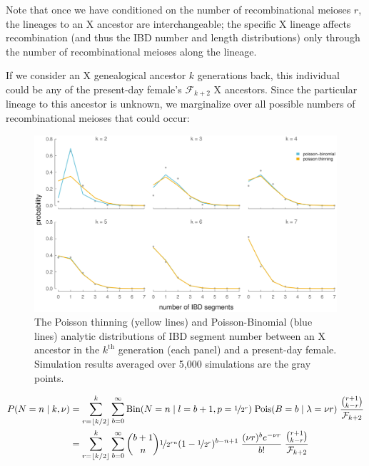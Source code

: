 \documentclass[11pt]{article}
\begin{document}
Note that once we have conditioned on the number of recombinational meioses $r$,
the lineages to an X ancestor are interchangeable; the specific X lineage
affects recombination (and thus the IBD number and length distributions) only
through the number of recombinational meioses along the lineage. 

If we consider an X genealogical ancestor $k$ generations back, this individual
could be any of the present-day female's $\mathcal{F}_{k+2}$ X ancestors. Since
the particular lineage to this ancestor is unknown, we marginalize over all
possible numbers of recombinational meioses that could occur:

\begin{figure}[!ht]
  \centering
  \includegraphics[width=\textwidth]{images/x-ancestor-blockcounts}

  \caption{The Poisson thinning (yellow lines) and Poisson-Binomial (blue
  lines) analytic distributions of IBD segment number between an X ancestor in
the $k^\text{th}$ generation (each panel) and a present-day female. Simulation
results averaged over 5,000 simulations are the gray points.}

  \label{fig:x-ancestor-blockcounts}

\end{figure}

\begin{align}
  P(N=n \;|\; k, \nu) &= \sum_{r=\lfloor k/2 \rfloor}^k \sum_{b=0}^\infty \text{Bin}(N=n \;|\; l=b+1, p=\nicefrac{1}{2^r}) \; \text{Pois}(B=b \;|\; \lambda=\nu r) \; \frac{{r+1 \choose k-r}}{\mathcal{F}_{k+2}} \nonumber \\
                      &= \sum_{r=\lfloor k/2 \rfloor}^k \sum_{b=0}^\infty {b + 1 \choose n } \nicefrac{1}{2^{rn}}(1 - \nicefrac{1}{2^r})^{b - n + 1} \; \frac{(\nu r)^b e^{-\nu r}}{b!} \; \frac{{r+1 \choose k-r}}{\mathcal{F}_{k+2}}
\end{align}
\end{document}
